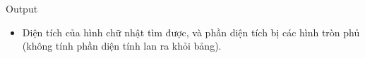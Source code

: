 Output
\begin{itemize}
	\item 

       Diện tích của hình chữ nhật tìm được, và phần diện tích bị các hình tròn phủ (không tính phần diện tính lan ra khỏi bảng).      
\\
\end{itemize}